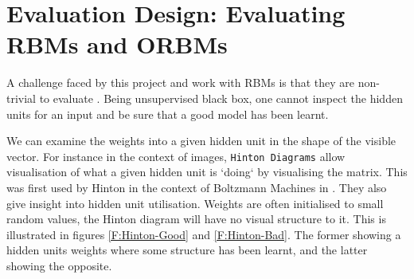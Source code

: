 \section{Evaluation Design: Evaluating RBMs and ORBMs}


  A challenge faced by this project and work with RBMs is that they are non-trivial to evaluate . Being unsupervised black box, one cannot inspect the hidden units for an input and be sure that a good model has been learnt.

  We can examine the weights into a given hidden unit in the shape of the visible vector. For instance in the context of images, \texttt{Hinton Diagrams} allow visualisation of what a given hidden unit is `doing` by visualising the matrix. This was first used by Hinton in the context of Boltzmann Machines in \cite{Hinton:1986:LRB:104279.104291}. They also give insight into hidden unit utilisation.  Weights are often initialised to small random values, the Hinton diagram will have no visual structure to it. This is illustrated in figures \ref{F:Hinton-Good} and \ref{F:Hinton-Bad}. The former showing a hidden units weights where some structure has been learnt, and the latter showing the opposite.


